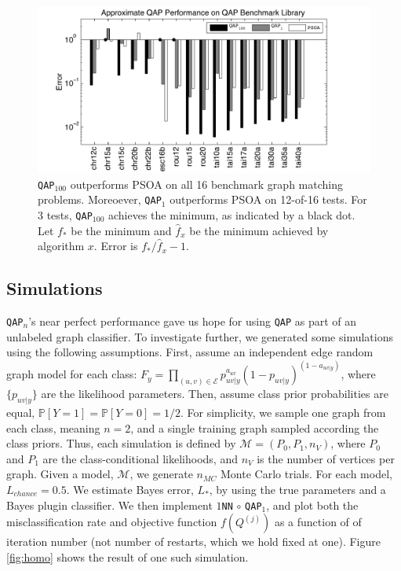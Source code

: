 \documentclass{article} %
\newcommand{\PP}{\mathbb{P}}           %
\providecommand{\mc}[1]{\mathcal{#1}}
\providecommand{\mh}[1]{\hat{#1}}
\newcommand{\qap}{\texttt{QAP} }
\newcommand{\qapa}{\texttt{QAP}$_1$ }
\newcommand{\qapb}{\texttt{QAP$_{100}$} }
\begin{document}
\begin{figure}[htbp]
	\centering			
	\includegraphics[width=1.0\linewidth]{../figs/benchmarks.pdf}
	\caption{\qapb outperforms PSOA on all 16 benchmark graph matching problems.  Moreoever, \qapa outperforms PSOA on 12-of-16 tests.  For 3 tests, \qapb achieves the minimum, as indicated by a black dot.  Let $f_*$ be the minimum and $\mh{f}_x$ be the minimum achieved by algorithm $x$.  Error is $f_*/\mh{f}_x-1$.  }
	\label{fig:fwpath}
\end{figure}




\subsection{Simulations}

\texttt{QAP}$_n$'s near perfect performance gave us hope for using \qap as part of an unlabeled graph classifier.  To investigate further, we generated some simulations using the following assumptions.  First, assume an independent edge random graph model for each class: $F_y=\prod_{(u,v) \in \mc{E}}p_{uv|y}^{a_{uv}} (1-p_{uv|y})^{(1-a_{uv|y})}$, where $\{p_{uv|y}\}$ are the likelihood parameters.  Then, assume class prior probabilities are equal, $\PP[Y=1]=\PP[Y=0]=1/2$.  For simplicity, we sample one graph from each class, meaning $n=2$, and a single training graph sampled according the class priors. Thus, each simulation is defined by $\mc{M}=(P_0,P_1,n_V)$, where $P_0$ and $P_1$ are the class-conditional likelihoods, and $n_V$ is the number of vertices per graph.  Given a model, $\mc{M}$, we generate $n_{MC}$ Monte Carlo trials.  For each model, $L_{chance}=0.5$.  We estimate Bayes error, $L_*$, by using the true parameters and a Bayes plugin classifier.  We then implement \texttt{$1$NN} $\circ$ \texttt{QAP}$_1$, and plot both the misclassification rate and objective function $f(Q^{(j)})$ as a function of of iteration number (not number of restarts, which we hold fixed at one). Figure \ref{fig:homo} shows the result of one such simulation.  
\end{document}
